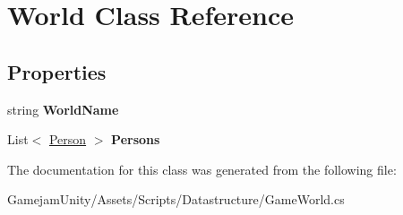 \hypertarget{class_world}{}\section{World Class Reference}
\label{class_world}
\subsection*{Properties}
\begin{DoxyCompactItemize}
\item 
\mbox{\label{class_world_a066b4282490f2481b2bb1502e24ff06a}} 
string {\bfseries World\+Name}
\item 
\mbox{\label{class_world_a2180db73d20db8e635d6e380331fabe8}} 
List$<$ \mbox{\hyperlink{class_person}{Person}} $>$ {\bfseries Persons}
\end{DoxyCompactItemize}


The documentation for this class was generated from the following file\+:\begin{DoxyCompactItemize}
\item 
Gamejam\+Unity/\+Assets/\+Scripts/\+Datastructure/Game\+World.\+cs\end{DoxyCompactItemize}
